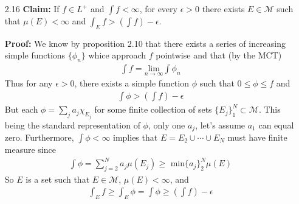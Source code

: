 \documentclass[11pt,letter]{article}
\begin{document}
\begin{enumerate}
    \item [2.16] \textbf{Claim:} If $f \in L^+$ and $\int f < \infty$, for every $\epsilon > 0$ there exists $E \in \mathcal{M}$ such that $\mu(E) < \infty$ and $\int_E f > (\int f) - \epsilon$.
    
    \textbf{Proof:} We know by proposition 2.10 that there exists a series of increasing simple functions $\{\phi_n\}$ whice approach $f$ pointwise and that (by the MCT) 
    \begin{align*}
        \int f = \underset{n \rightarrow \infty}{\text{ lim }} \int \phi_n
    \end{align*}
    Thus for any $\epsilon > 0$, there exists a simple function $\phi$ such that $0 \le \phi \le f$ and
    \begin{align*}
        \int \phi > (\int f) - \epsilon
    \end{align*}
     But each $\phi = \sum_j a_j \chi_{E_j}$ for some finite collection of sets $\{E_j\}_1^N \subset \mathcal{M}$. This being the standard representation of $\phi$, only one $a_j$, let's assume $a_1$ can equal zero. Furthermore, $\int \phi < \infty$ implies that $E = E_2 \cup \cdots \cup E_N$ must have finite measure since 
     \begin{align*}
        \int \phi = \sum_{j=2}^N a_j \mu(E_j) \ge \text{ min}\{a_j\}_2^N \mu(E)
     \end{align*} 
     So $E$ is a set such that $E \in \mathcal{M}$, $\mu(E) < \infty$, and
     \begin{align*}
         \int_E f \ge \int_E \phi = \int \phi \ge (\int f) - \epsilon
     \end{align*}

\end{enumerate}
\end{document}
